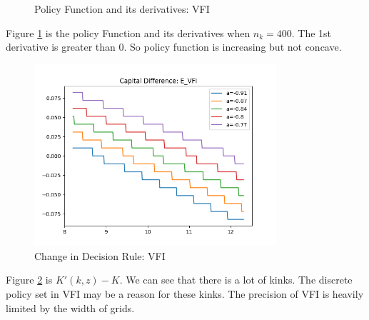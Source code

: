 \documentclass{article}
\begin{document}
	\begin{figure}[H]
		\centering
		\caption{Policy Function and its derivatives: VFI}
		\label{fig:pfunc_VFI}
	\end{figure}
	Figure \ref{fig:pfunc_VFI} is the policy Function and its derivatives when $n_k=400$.
	The 1st derivative is greater than 0.
	So policy function is increasing but not concave.
	
	\begin{figure}[H]
		\centering
		\includegraphics[width=0.8\textwidth]{../figures/problem_set_2/E_KDiff.png}
		\caption{Change in Decision Rule: VFI}
		\label{fig:dk_VFI}
	\end{figure}
	Figure \ref{fig:dk_VFI} is $K'(k,z)-K$.
	We can see that there is a lot of kinks.
	The discrete policy set in VFI may be a reason for these kinks.
	The precision of VFI is heavily limited by the width of grids.
	
\end{document}
